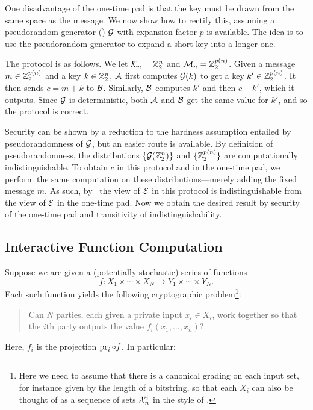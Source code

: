 \begin{ex}\label{ex:botp}
  One disadvantage of the one-time pad is that the key must be drawn from the
  same space as the message. We now show how to rectify this, assuming a
  pseudorandom generator
  ()
  $\mathcal{G}$ with expansion factor $p$ is available.
  The idea is to use the pseudorandom generator to expand a short
    key into a longer one.

  The protocol is as follows. We let $\mathcal{K}_n = \mathbb{Z}_2^n$ and $\mathcal{M}_n =
  \mathbb{Z}_2^{p(n)}$. Given a message $m\in\mathbb{Z}_2^{p(n)}$ and a key $k\in\mathbb{Z}_2^n$,
  $\mathcal{A}$ first computes $\mathcal{G}(k)$ to get a key $k'\in\mathbb{Z}_2^{p(n)}$. It then sends
  $c = m + k$ to $\mathcal{B}$. Similarly, $\mathcal{B}$ computes $k'$ and then $c - k'$, which
  it outputs. Since $\mathcal{G}$ is deterministic, both $\mathcal{A}$ and $\mathcal{B}$ get the same
  value for $k'$, and so the protocol is correct.

  Security can be shown by a reduction to the hardness assumption entailed by
  pseudorandomness of $\mathcal{G}$, but an easier route is available. By definition of
  pseudorandomness, the distributions $\{\mathcal{G}(\mathbb{Z}_2^n)\}$ and $\{\mathbb{Z}_2^{p(n)}\}$
  are computationally indistinguishable. To obtain $c$ in this protocol and in
  the one-time pad, we perform the same computation on these
  distributions---merely adding the fixed message $m$. As such,
  by~ the view of $\mathcal{E}$ in this
  protocol is indistinguishable from the view of $\mathcal{E}$ in the one-time pad. Now
  we obtain the desired result by security of the one-time pad and transitivity
  of indistinguishability.
\end{ex}

\subsection{Interactive Function Computation}

Suppose we are given a (potentially stochastic) series of functions \[
  f: X_1\times\cdots\times X_N\to Y_1\times\cdots\times Y_N.
\] Each such function yields the following cryptographic problem\footnote{
  Here we need to assume that there is a canonical grading on each input set, for
  instance given by the length of a bitstring, so that each $X_i$ can also be
  thought of as a sequence of sets $\mathcal{X}^i_n$ in the style of
  .
}:
\begin{quote}
  Can $N$ parties, each given a private input $x_i\in X_i$, work together so
  that the $i$th party outputs the value $f_i(x_1,\dots,x_n)$?
\end{quote}
Here, $f_i$ is the projection $\operatorname{pr}_i\circ f$. In particular:

